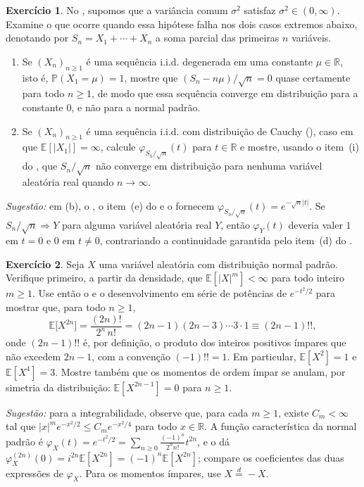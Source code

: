 \documentclass[12pt,portuguese]{article}
\theoremstyle{definition}
\theoremstyle{plainexercise}
\newtheorem{exercise}{Exercício}
\theoremstyle{starredexercise}
\theoremstyle{definition}
\begin{document}
\begin{exercise}\label{exercise:tlc-imediato-hipoteses-variancia}
No , supomos que a variância comum $\sigma^2$ satisfaz
$\sigma^2\in(0,\infty)$. Examine o que ocorre quando essa hipótese falha nos dois
casos extremos abaixo, denotando por $S_n=X_1+\cdots+X_n$ a soma parcial das
primeiras $n$ variáveis.
\begin{enumerate}[label=(\alph*)]
\item Se $(X_n)_{n\geqslant1}$ é uma sequência i.i.d. degenerada em uma
constante $\mu\in\mathbb{R}$, isto é, $\mathbb{P}(X_1=\mu)=1$, mostre que
$(S_n-n\mu)/\sqrt{n}=0$ quase certamente para todo $n\geqslant1$, de modo que
essa sequência converge em distribuição para a constante $0$, e não para a
normal padrão.
\item Se $(X_n)_{n\geqslant1}$ é uma sequência i.i.d. com distribuição de Cauchy
(), caso em que $\mathbb{E}[|X_1|]=\infty$, calcule
$\varphi_{S_n/\sqrt{n}}(t)$ para $t\in\mathbb{R}$ e mostre, usando o item~(i) do
, que $S_n/\sqrt{n}$ não converge em distribuição para
nenhuma variável aleatória real quando $n\to\infty$.
\end{enumerate}

\noindent\emph{Sugestão:} em (b), o , o item~(e) do
 e o  fornecem
$\varphi_{S_n/\sqrt{n}}(t)=e^{-\sqrt{n}|t|}$. Se $S_n/\sqrt{n}\Rightarrow Y$
para alguma variável aleatória real $Y$, então $\varphi_Y(t)$ deveria valer $1$
em $t=0$ e $0$ em $t\neq0$, contrariando a continuidade garantida pelo item~(d)
do .
\end{exercise}

\begin{exercise}\label{exercise:momentos-normal}
Seja $X$ uma variável aleatória com distribuição normal padrão.
Verifique primeiro, a partir da densidade, que
$\mathbb{E}[|X|^m]<\infty$ para todo inteiro $m\geqslant1$.
Use então o  e o desenvolvimento em série de potências de
$e^{-t^{2}/2}$ para mostrar que, para todo $n\geqslant1$,
\[
  \mathbb{E}\bigl[X^{2n}\bigr]=\frac{(2n)!}{2^{n}\,n!}
  =(2n-1)(2n-3)\cdots3\cdot1\equiv(2n-1)!!,
\]
onde $(2n-1)!!$ é, por definição, o produto dos inteiros positivos ímpares que
não excedem $2n-1$, com a convenção $(-1)!!=1$. Em particular,
$\mathbb{E}[X^{2}]=1$ e $\mathbb{E}[X^{4}]=3$. Mostre também que os momentos de
ordem ímpar se anulam, por simetria da distribuição:
$\mathbb{E}[X^{2n-1}]=0$ para $n\geqslant1$.

\noindent\emph{Sugestão:} para a integrabilidade, observe que, para cada
$m\geqslant1$, existe $C_m<\infty$ tal que
$|x|^m e^{-x^2/2}\leqslant C_m e^{-x^2/4}$ para todo $x\in\mathbb{R}$.
A função característica da normal padrão é
$\varphi_X(t)=e^{-t^{2}/2}=\sum_{n\geqslant0}\frac{(-1)^{n}}{2^{n}n!}t^{2n}$, e o
 dá
$\varphi_X^{(2n)}(0)=i^{2n}\mathbb{E}[X^{2n}]=(-1)^{n}\mathbb{E}[X^{2n}]$;
compare os coeficientes das duas expressões de $\varphi_X$. Para os momentos
ímpares, use $X\overset{d}{=}-X$.
\end{exercise}
\end{document}
